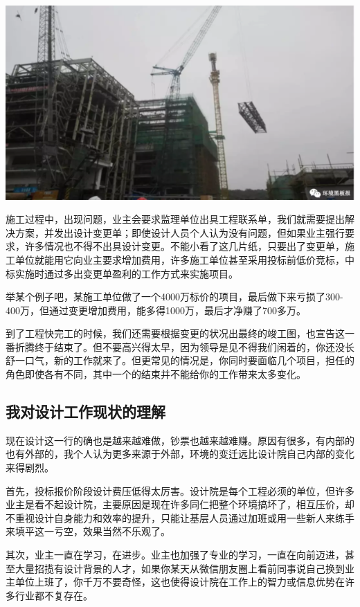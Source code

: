 \documentclass[]{book}
\begin{document}
\includegraphics[width=8.33in]{images/sisi3}

施工过程中，出现问题，业主会要求监理单位出具工程联系单，我们就需要提出解决方案，并发出设计变更单；即使设计人员个人认为没有问题，但如果业主强行要求，许多情况也不得不出具设计变更。不能小看了这几片纸，只要出了变更单，施工单位就能用它向业主要求增加费用，许多施工单位甚至采用投标前低价竞标，中标实施时通过多出变更单盈利的工作方式来实施项目。

举某个例子吧，某施工单位做了一个4000万标价的项目，最后做下来亏损了300-400万，但通过变更增加费用，能多得1000万，最后才净赚了700多万。

到了工程快完工的时候，我们还需要根据变更的状况出最终的竣工图，也宣告这一番折腾终于结束了。但不要高兴得太早，因为领导是见不得我们闲着的，你还没长舒一口气，新的工作就来了。但更常见的情况是，你同时要面临几个项目，担任的角色即使各有不同，其中一个的结束并不能给你的工作带来太多变化。

\subsection{我对设计工作现状的理解}

现在设计这一行的确也是越来越难做，钞票也越来越难赚。原因有很多，有内部的也有外部的，我个人认为更多来源于外部，环境的变迁远比设计院自己内部的变化来得剧烈。

首先，投标报价阶段设计费压低得太厉害。设计院是每个工程必须的单位，但许多业主是看不起设计院，主要原因是现在许多同仁把整个环境搞坏了，相互压价，却不重视设计自身能力和效率的提升，只能让基层人员通过加班或用一些新人来练手来填平这一亏空，效果当然不乐观了。

其次，业主一直在学习，在进步。业主也加强了专业的学习，一直在向前迈进，甚至大量招揽有设计背景的人才，如果你某天从微信朋友圈上看前同事说自己换到业主单位上班了，你千万不要奇怪，这也使得设计院在工作上的智力或信息优势在许多行业都不复存在。
\end{document}
